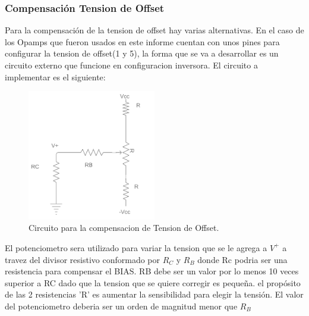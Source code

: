 \documentclass[a4paper]{article}
\begin{document}
\subsubsection{Compensación Tension de Offset}
Para la compensación de la tension de offset hay varias alternativas. En el caso de los Opamps que fueron usados en este informe cuentan con unos pines para configurar la tension de offset(1 y 5), la forma que se va a desarrollar es un circuito externo que funcione en configuracion inversora.
El circuito a implementar es el siguiente:
\begin{figure}[H]	
	\centering
	\includegraphics[width=0.5\textwidth]{imagenes/CompensacionOff.PNG}
	\caption{Circuito para la compensacion de Tension de Offset.}
	\label{fig:CompensacionOff}
\end{figure}
El potenciometro sera utilizado para variar la tension que se le agrega a $V^+$ a travez del divisor resistivo conformado por $R_C$ y $R_B$ donde Rc podria ser una resistencia para compensar el BIAS. RB debe ser un valor por lo menos 10 veces superior a RC dado que la tension que se quiere corregir es pequeña. el propósito de las 2 resistencias 'R' es aumentar la sensibilidad para elegir la tensión. El valor del potenciometro deberia ser un orden de magnitud menor que $R_B $
\end{document}
